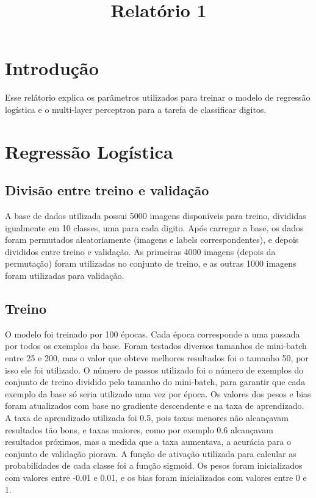 \documentclass[conference]{IEEEtran}
\begin{document}
\title{Relatório 1}

\author{
}


\maketitle

\section{Introdução}
Esse relátorio explica os parâmetros utilizados para treinar o modelo de regressão logística e o multi-layer perceptron para a tarefa de classificar digitos.

\section{Regressão Logística}

\subsection{Divisão entre treino e validação}
A base de dados utilizada possui 5000 imagens disponíveis para treino, divididas igualmente em 10 classes, uma para cada digito. Após carregar a base, os dados foram permutados aleatoriamente (imagens e labels correspondentes), e depois divididos entre treino e validação. As primeiras 4000 imagens (depois da permutação) foram utilizadas no conjunto de treino, e as outras 1000 imagens foram utilizadas para validação.

\subsection{Treino}
O modelo foi treinado por 100 épocas. Cada época corresponde a uma passada por todos os exemplos da base. Foram testados diversos tamanhos de mini-batch entre 25 e 200, mas o valor que obteve melhores resultados foi o tamanho 50, por isso ele foi utilizado. O número de passos utilizado foi o número de exemplos do conjunto de treino dividido pelo tamanho do mini-batch, para garantir que cada exemplo da base só seria utilizado uma vez por época. Os valores dos pesos e bias foram atualizados com base no gradiente descendente e na taxa de aprendizado. A taxa de aprendizado utilizada foi 0.5, pois taxas menores não alcançavam resultados tão bons, e taxas maiores, como por exemplo 0.6 alcançavam resultados próximos, mas a medida que a taxa aumentava, a acurácia para o conjunto de validação piorava. A função de ativação utilizada para calcular as probabilidades de cada classe foi a função sigmoid. Os pesos foram inicializados com valores entre -0.01 e 0.01, e os bias foram inicializados com valores entre 0 e 1.
\end{document}
